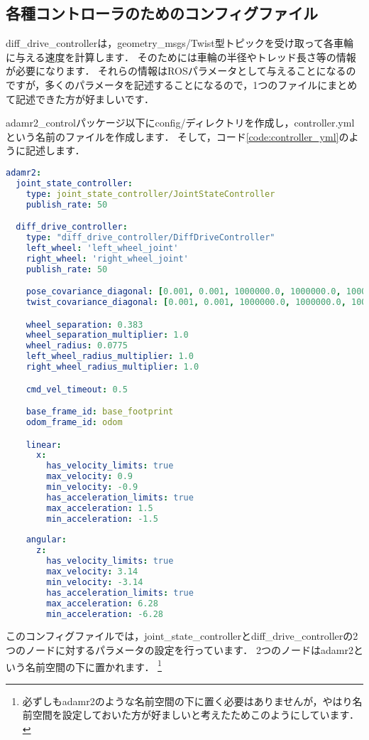 \documentclass[{../../master}]{subfiles}
\begin{document}
\subsection{各種コントローラのためのコンフィグファイル}

\textsf{diff\_drive\_controller}は，\textsf{geometry\_msgs/Twist}型トピックを受け取って各車輪に与える速度を計算します．
そのためには車輪の半径やトレッド長さ等の情報が必要になります．
それらの情報はROSパラメータとして与えることになるのですが，多くのパラメータを記述することになるので，1つのファイルにまとめて記述できた方が好ましいです．

\textsf{adamr2\_control}パッケージ以下に\textsf{config/}ディレクトリを作成し，\textsf{controller.yml}という名前のファイルを作成します．
そして，コード\ref{code:controller_yml}のように記述します．

\begin{lstlisting}[language=YAML, label=code:controller_yml, caption=\textsf{controller.yml}]
adamr2:
  joint_state_controller:
    type: joint_state_controller/JointStateController
    publish_rate: 50

  diff_drive_controller:
    type: "diff_drive_controller/DiffDriveController"
    left_wheel: 'left_wheel_joint'
    right_wheel: 'right_wheel_joint'
    publish_rate: 50

    pose_covariance_diagonal: [0.001, 0.001, 1000000.0, 1000000.0, 1000000.0, 10.0]
    twist_covariance_diagonal: [0.001, 0.001, 1000000.0, 1000000.0, 1000000.0, 10.0]

    wheel_separation: 0.383
    wheel_separation_multiplier: 1.0
    wheel_radius: 0.0775
    left_wheel_radius_multiplier: 1.0
    right_wheel_radius_multiplier: 1.0

    cmd_vel_timeout: 0.5

    base_frame_id: base_footprint
    odom_frame_id: odom

    linear:
      x:
        has_velocity_limits: true
        max_velocity: 0.9
        min_velocity: -0.9
        has_acceleration_limits: true
        max_acceleration: 1.5
        min_acceleration: -1.5
      
    angular:
      z:
        has_velocity_limits: true
        max_velocity: 3.14
        min_velocity: -3.14
        has_acceleration_limits: true
        max_acceleration: 6.28
        min_acceleration: -6.28
\end{lstlisting}

このコンフィグファイルでは，\textsf{joint\_state\_controller}と\textsf{diff\_drive\_controller}の2つのノードに対するパラメータの設定を行っています．
2つのノードは\textsf{adamr2}という名前空間の下に置かれます．
\footnote{必ずしも\textsf{adamr2}のような名前空間の下に置く必要はありませんが，やはり名前空間を設定しておいた方が好ましいと考えたためこのようにしています．}
\end{document}
